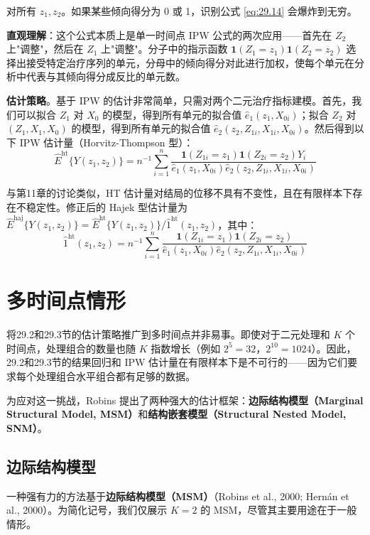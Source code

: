 对所有 $z_1, z_2$。如果某些倾向得分为 0 或 1，识别公式 \ref{eq:29.14} 会爆炸到无穷。

\textbf{直观理解}：这个公式本质上是单一时间点 IPW 公式的两次应用——首先在 $Z_2$ 上"调整"，然后在 $Z_1$ 上"调整"。分子中的指示函数 $\mathbf{1}(Z_1 = z_1) \mathbf{1}(Z_2 = z_2)$ 选择出接受特定治疗序列的单元，分母中的倾向得分对此进行加权，使每个单元在分析中代表与其倾向得分成反比的单元数。

\textbf{估计策略}。基于 IPW 的估计非常简单，只需对两个二元治疗指标建模。首先，我们可以拟合 $Z_1$ 对 $X_0$ 的模型，得到所有单元的拟合值 $\hat{e}_1(z_1, X_{0i})$；拟合 $Z_2$ 对 $(Z_1, X_1, X_0)$ 的模型，得到所有单元的拟合值 $\hat{e}_2(z_2, Z_{1i}, X_{1i}, X_{0i})$。然后得到以下 IPW 估计量（Horvitz-Thompson 型）：
\[
\hat{E}^{\mathrm{ht}}\{Y(z_1, z_2)\} = n^{-1} \sum_{i=1}^n \frac{\mathbf{1}(Z_{1i} = z_1) \mathbf{1}(Z_{2i} = z_2) Y_i}{\hat{e}_1(z_1, X_{0i}) \hat{e}_2(z_2, Z_{1i}, X_{1i}, X_{0i})}
\tag{29.16}
\]

与第11章的讨论类似，HT 估计量对结局的位移不具有不变性，且在有限样本下存在不稳定性。修正后的 Hajek 型估计量为 $\hat{E}^{\mathrm{haj}}\{Y(z_1, z_2)\} = \hat{E}^{\mathrm{ht}}\{Y(z_1, z_2)\} / \hat{1}^{\mathrm{ht}}(z_1, z_2)$，其中：
\[
\hat{1}^{\mathrm{ht}}(z_1, z_2) = n^{-1} \sum_{i=1}^n \frac{\mathbf{1}(Z_{1i} = z_1) \mathbf{1}(Z_{2i} = z_2)}{\hat{e}_1(z_1, X_{0i}) \hat{e}_2(z_2, Z_{1i}, X_{1i}, X_{0i})}
\tag{29.17}
\]

\section{多时间点情形}\label{sec:29-5}

将29.2和29.3节的估计策略推广到多时间点并非易事。即使对于二元处理和 $K$ 个时间点，处理组合的数量也随 $K$ 指数增长（例如 $2^5 = 32$，$2^{10} = 1024$）。因此，29.2和29.3节的结果回归和 IPW 估计量在有限样本下是不可行的——因为它们要求每个处理组合水平组合都有足够的数据。

为应对这一挑战，Robins 提出了两种强大的估计框架：\textbf{边际结构模型（Marginal Structural Model, MSM）}和\textbf{结构嵌套模型（Structural Nested Model, SNM）}。

\subsection{边际结构模型}\label{sec:29-5-1}

一种强有力的方法基于\textbf{边际结构模型（MSM）}（Robins et al., 2000; Hernán et al., 2000）。为简化记号，我们仅展示 $K=2$ 的 MSM，尽管其主要用途在于一般情形。

